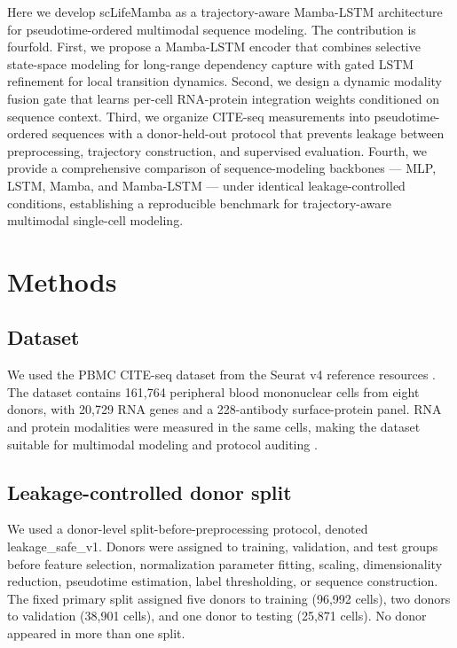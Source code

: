 \documentclass[11pt,twocolumn]{article}
\begin{document}
Here we develop scLifeMamba as a trajectory-aware Mamba-LSTM architecture for pseudotime-ordered multimodal sequence modeling. The contribution is fourfold. First, we propose a Mamba-LSTM encoder that combines selective state-space modeling for long-range dependency capture with gated LSTM refinement for local transition dynamics. Second, we design a dynamic modality fusion gate that learns per-cell RNA-protein integration weights conditioned on sequence context. Third, we organize CITE-seq measurements into pseudotime-ordered sequences with a donor-held-out protocol that prevents leakage between preprocessing, trajectory construction, and supervised evaluation. Fourth, we provide a comprehensive comparison of sequence-modeling backbones --- MLP, LSTM, Mamba, and Mamba-LSTM --- under identical leakage-controlled conditions, establishing a reproducible benchmark for trajectory-aware multimodal single-cell modeling.

\section{Methods}

\subsection{Dataset}

We used the PBMC CITE-seq dataset from the Seurat v4 reference resources \citep{hao2021}. The dataset contains 161,764 peripheral blood mononuclear cells from eight donors, with 20,729 RNA genes and a 228-antibody surface-protein panel. RNA and protein modalities were measured in the same cells, making the dataset suitable for multimodal modeling and protocol auditing \citep{stoeckius2017,Zheng2017Massively}.

\subsection{Leakage-controlled donor split}

We used a donor-level split-before-preprocessing protocol, denoted leakage\_safe\_v1. Donors were assigned to training, validation, and test groups before feature selection, normalization parameter fitting, scaling, dimensionality reduction, pseudotime estimation, label thresholding, or sequence construction. The fixed primary split assigned five donors to training (96,992 cells), two donors to validation (38,901 cells), and one donor to testing (25,871 cells). No donor appeared in more than one split.
\end{document}
